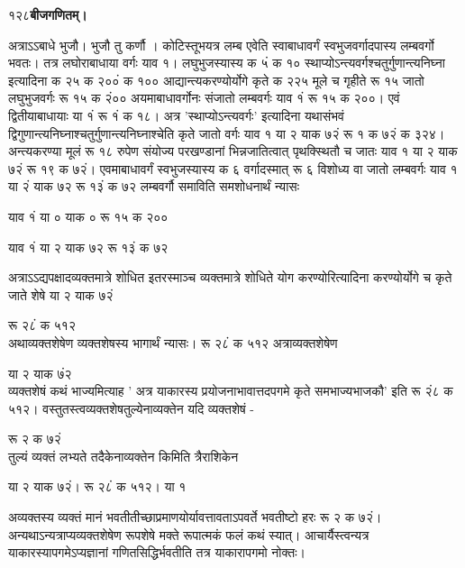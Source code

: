 \documentclass[11pt, openany]{book}
\begin{document}
\onehalfspacing
१२८\hspace{2in}\textbf{बीजगणितम्।} 

\vspace{5mm}

\begin{sloppypar}
\hangindent=0.2in अत्राऽऽबाधे भुजौ। भुजौ तु कर्णौ । कोटिस्तूभयत्र लम्ब एवेति स्वाबाधावर्गं स्वभुजवर्गादपास्य लम्बवर्गो भवतः। तत्र लघोराबाधाया वर्गः याव १। लघुभुजस्यास्य क ५ं क १० स्थाप्योऽन्त्यवर्गश्चतुर्गुणान्त्यनिघ्ना इत्यादिना क २५ क २००ं क १०० आद्यान्त्यकरण्योर्योगे कृते क २२५ मूले च गृहीते रू १५ जातो लघुभुजवर्गः रू १५ क २ं०० अयमाबाधावर्गोनः संजातो लम्बवर्गः याव १ं रू १५ क २००। एवं द्वितीयाबाधायाः या १ं रू १ं क १८। अत्र 'स्थाप्योऽन्त्यवर्गः' इत्यादिना यथासंभवं द्विगुणान्त्यनिघ्नाश्चतुर्गुणान्त्यनिघ्नाश्चेति कृते जातो वर्गः याव १ या २ याक ७२ं रू १ क ७२ं क ३२४। अन्त्यकरण्या मूलं रू १८ रुपेण संयोज्य परखण्डानां भिन्नजातित्वात् पृथक्स्थितौ च जातः याव १ या २ याक ७२ं रू १९ क ७२ं। एवमाबाधावर्गं स्वभुजस्यास्य क ६ वर्गादस्मात् रू ६ विशोध्य वा जातो लम्बवर्गः याव १ या २ं याक ७२ रू १३ं क ७२ लम्बवर्गौ समाविति समशोधनार्थं न्यासः

\begin{center}
याव १ं या ० याक ० रू १५ क २००

याव १ं या २ याक ७२ रू १३ं क ७२
\end{center}

\hangindent=0.2in अत्राऽऽद्यपक्षादव्यक्तमात्रे शोधित इतरस्माञ्च व्यक्तमात्रे शोधिते योग करण्योरित्यादिना करण्योर्योगे च कृते जाते शेषे या २ याक ७२ं

\hspace{1.1in}रू २८ं क ५१२\\

\hangindent=0.2in अथाव्यक्तशेषेण व्यक्तशेषस्य भागार्थं न्यासः। रू २८ं क ५१२ अत्राव्यक्तशेषेण

\hspace{2.75in}या २ याक ७ं२\\

\hangindent=0.2in व्यक्तशेषं कथं भाज्यमित्याह ' अत्र याकारस्य प्रयोजनाभावात्तदपगमे कृते समभाज्यभाजकौ' इति रू २ं८ क ५१२। वस्तुतस्त्वव्यक्तशेषतुल्येनाव्यक्तेन यदि व्यक्तशेषं -

 रू २ क ७२ं\\

\hangindent=0.2in तुल्यं व्यक्तं लभ्यते तदैकेनाव्यक्तेन किमिति त्रैराशिकेन

\begin{center}
या २ याक ७२ं। रू २८ं क ५१२। या १
\end{center}

\hangindent=0.2in अव्यक्तस्य व्यक्तं मानं भवतीतीच्छाप्रमाणयोर्यावत्तावताऽपवर्ते भवतीष्टो हरः रू २ क ७२ं। अन्यथाऽन्यत्राप्यव्यक्तशेषेण रूपशेषे मक्ते रूपात्मकं फलं कथं स्यात्। आचार्यैस्त्वन्यत्र याकारस्यापगमेऽप्यज्ञानां गणितसिद्धिर्भवतीति तत्र याकारापगमो नोक्तः।
\end{sloppypar}
\thispagestyle{empty}
\newpage
\end{document}
